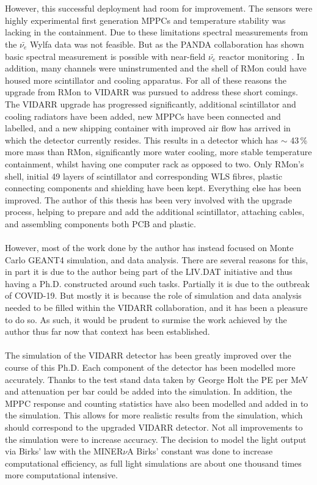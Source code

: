 \\\\However, this successful deployment had room for improvement. The sensors were highly experimental first generation MPPCs and temperature stability was lacking in the containment. Due to these limitations spectral measurements from the $\bar{\nu_e}$ Wylfa data was not feasible. But as the PANDA collaboration has shown basic spectral measurement is possible with near-field $\bar{\nu_e}$ reactor monitoring \cite{IIRIE_Panda_2021}. In addition, many channels were uninstrumented and the shell of RMon could have housed more scintillator and cooling apparatus. For all of these reasons the upgrade from RMon to VIDARR was pursued to address these short comings. The VIDARR upgrade has progressed significantly, additional scintillator and cooling radiators have been added, new MPPCs have been connected and labelled, and a new shipping container with improved air flow has arrived in which the detector currently resides. This results in a detector which has $\sim$ 43\,\% more mass than RMon, significantly more water cooling, more stable temperature containment, whilst having one computer rack as opposed to two. Only RMon's shell, initial 49 layers of scintillator and corresponding WLS fibres, plastic connecting components and shielding have been kept. Everything else has been improved. The author of this thesis has been very involved with the upgrade process, helping to prepare and add the additional scintillator, attaching cables, and assembling components both PCB and plastic. 
\\\\However, most of the work done by the author has instead focused on Monte Carlo GEANT4 \cite{Agostinelli:2002hh} simulation, and data analysis. There are several reasons for this, in part it is due to the author being part of the LIV.DAT initiative and thus having a Ph.D. constructed around such tasks. Partially it is due to the outbreak of COVID-19. But mostly it is because the role of simulation and data analysis needed to be filled within the VIDARR collaboration, and it has been a pleasure to do so. As such, it would be prudent to surmise the work achieved by the author thus far now that context has been established. 
\\\\The simulation of the VIDARR detector has been greatly improved over the course of this Ph.D. Each component of the detector has been modelled more accurately. Thanks to the test stand data taken by George Holt the PE per MeV and attenuation per bar could be added into the simulation. In addition, the MPPC response and counting statistics have also been modelled and added in to the simulation. This allows for more realistic results from the simulation, which should correspond to the upgraded VIDARR detector. Not all improvements to the simulation were to increase accuracy. The decision to model the light output via Birks' law with the MINER$\nu$A Birks' constant was done to increase computational efficiency, as full light simulations are about one thousand times more computational intensive. 

